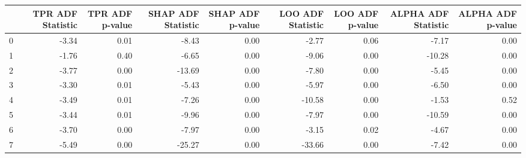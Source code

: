 \begin{tabular}{lrrrrrrrr}
\toprule
 & TPR ADF Statistic & TPR ADF p-value & SHAP ADF Statistic & SHAP ADF p-value & LOO ADF Statistic & LOO ADF p-value & ALPHA ADF Statistic & ALPHA ADF p-value \\
\midrule
0 & -3.34 & 0.01 & -8.43 & 0.00 & -2.77 & 0.06 & -7.17 & 0.00 \\
1 & -1.76 & 0.40 & -6.65 & 0.00 & -9.06 & 0.00 & -10.28 & 0.00 \\
2 & -3.77 & 0.00 & -13.69 & 0.00 & -7.80 & 0.00 & -5.45 & 0.00 \\
3 & -3.30 & 0.01 & -5.43 & 0.00 & -5.97 & 0.00 & -6.50 & 0.00 \\
4 & -3.49 & 0.01 & -7.26 & 0.00 & -10.58 & 0.00 & -1.53 & 0.52 \\
5 & -3.44 & 0.01 & -9.96 & 0.00 & -7.97 & 0.00 & -10.59 & 0.00 \\
6 & -3.70 & 0.00 & -7.97 & 0.00 & -3.15 & 0.02 & -4.67 & 0.00 \\
7 & -5.49 & 0.00 & -25.27 & 0.00 & -33.66 & 0.00 & -7.42 & 0.00 \\
\bottomrule
\end{tabular}
